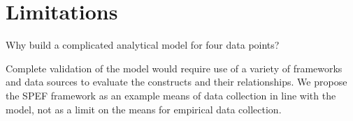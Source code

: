 \section{Limitations}
\label{sec:limitations}


Why build a complicated analytical model for four data points? 


Complete validation of the model would require use of a variety of frameworks and data sources to evaluate the constructs and their relationships. We propose the SPEF framework as an example means of data collection in line with the model, not as a limit on the means for empirical data collection. 
